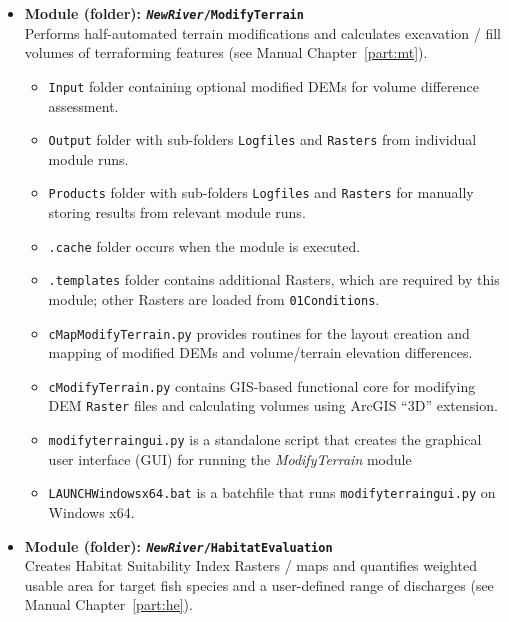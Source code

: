 \begin{itemize}
\begin{itemize}
		\item \texttt{LAUNCH{\myUnderscore}Windows{\myUnderscore}x64.bat} is a batchfile that runs \texttt{action{\myUnderscore}planner{\myUnderscore}gui.py}.
	\end{itemize}
	\item \textbf{Module (folder): \texttt{\textit{NewRiver}/ModifyTerrain}}\\
	Performs half-automated terrain modifications and calculates excavation / fill volumes of terraforming features (see Manual Chapter~\ref{part:mt}).
	\begin{itemize}
		\item \texttt{Input} folder containing optional modified DEMs for volume difference assessment.
		\item \texttt{Output} folder with sub-folders \texttt{Logfiles} and \texttt{Rasters} from individual module runs.
		\item \texttt{Products} folder with sub-folders \texttt{Logfiles} and \texttt{Rasters} for manually storing results from relevant module runs.
		\item \texttt{.cache} folder occurs when the module is executed.
		\item \texttt{.templates} folder contains additional Rasters, which are required by this module; other Rasters are loaded from \texttt{01{\myUnderscore}Conditions}.		
		\item \texttt{cMapModifyTerrain.py} provides routines for the layout creation and mapping of modified DEMs and volume/terrain elevation differences.
		\item \texttt{cModifyTerrain.py} contains GIS-based functional core for modifying DEM \texttt{Raster} files and calculating volumes using ArcGIS ``3D'' extension.		
		\item \texttt{modify{\myUnderscore}terrain{\myUnderscore}gui.py} is a standalone script that creates the graphical user interface (GUI) for running the \textit{ModifyTerrain} module
		\item \texttt{LAUNCH{\myUnderscore}Windows{\myUnderscore}x64.bat} is a batchfile that runs \texttt{modify{\myUnderscore}terrain{\myUnderscore}gui.py} on Windows x64.
	\end{itemize}
	\item \textbf{Module (folder): \texttt{\textit{NewRiver}/HabitatEvaluation}}\\
	Creates Habitat Suitability Index Rasters / maps and quantifies weighted usable area for target fish species and a user-defined range of discharges (see Manual Chapter~\ref{part:he}).

\end{itemize}

